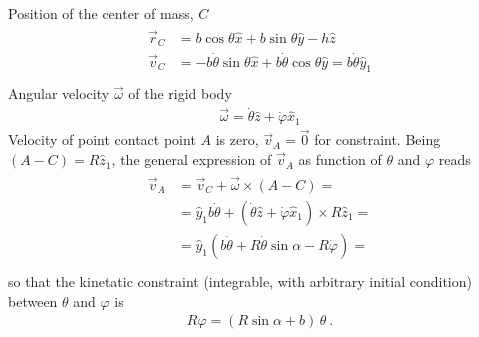 \documentclass[letterpaper,10pt,english]{jupyterBook}
\begin{document}
\sphinxAtStartPar
Position of the center of mass, \(C\)
\begin{equation*}
\begin{split}\begin{aligned}
  \vec{r}_C & = b \cos \theta \hat{x} + b \sin \theta \hat{y} - h \hat{z} \\
  \vec{v}_C & = -b \dot{\theta} \sin \theta \hat{x} + b \dot{\theta} \cos \theta \hat{y} = b \dot{\theta} \hat{y}_1 \\
\end{aligned}\end{split}
\end{equation*}
\sphinxAtStartPar
Angular velocity \(\vec{\omega}\) of the rigid body
\begin{equation*}
\begin{split}\vec{\omega} = \dot{\theta} \hat{z} + \dot{\varphi} \hat{x}_1\end{split}
\end{equation*}
\sphinxAtStartPar
Velocity of point contact point \(A\) is zero, \(\vec{v}_A = \vec{0}\) for  constraint. Being \((A-C) = R \hat{z}_1\), the general expression of \(\vec{v}_A\) as function of \(\theta\) and \(\varphi\) reads
\begin{equation*}
\begin{split}\begin{aligned}
 \vec{v}_A
 & = \vec{v}_C + \vec{\omega} \times \left( A - C \right) = \\
 & = \hat{y}_1 b \dot{\theta} + \left( \dot{\theta} \hat{z} + \dot{\varphi} \hat{x}_1 \right) \times R \hat{z}_1 = \\
 & = \hat{y}_1 \left( b \dot{\theta} + R \dot{\theta} \sin \alpha - R \dot{\varphi} \right) = \\
\end{aligned}\end{split}
\end{equation*}
\sphinxAtStartPar
so that the kinetatic constraint (integrable, with arbitrary initial condition) between \(\theta\) and \(\varphi\) is
\begin{equation*}
\begin{split}R \varphi = \left( R \sin \alpha + b \right) \, \theta \ .\end{split}
\end{equation*}
\sphinxAtStartPar
{}
\end{document}
